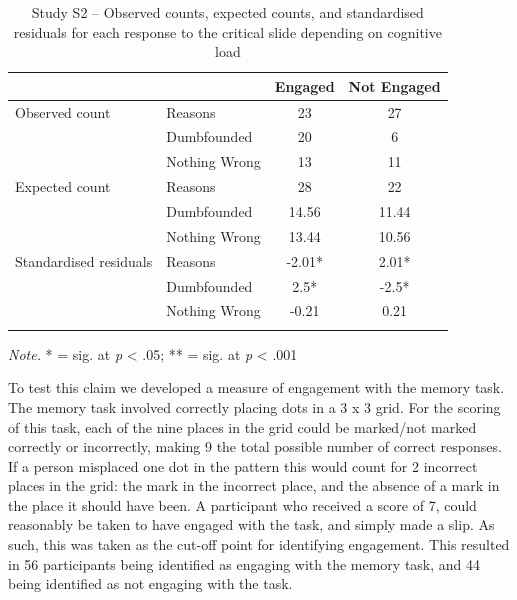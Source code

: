 \documentclass[
  american,
  man,floatsintext]{apa7}
\begin{document}
\begin{table}[tbp]

\begin{center}
\begin{threeparttable}

\caption{\label{tab:S2S2tab1dumb}Study S2 – Observed counts, expected counts, and standardised residuals for each response to the critical slide depending on cognitive load}

\begin{tabular}{llcc}
\toprule
 & \multicolumn{1}{c}{} & \multicolumn{1}{c}{Engaged} & \multicolumn{1}{c}{Not Engaged}\\
\midrule
Observed count & Reasons & 23 & 27\\
 & Dumbfounded & 20 & 6\\
 & Nothing Wrong & 13 & 11\\
Expected count & Reasons & 28 & 22\\
 & Dumbfounded & 14.56 & 11.44\\
 & Nothing Wrong & 13.44 & 10.56\\
Standardised residuals & Reasons & -2.01* & 2.01*\\
 & Dumbfounded & 2.5* & -2.5*\\
 & Nothing Wrong & -0.21 & 0.21\\
\bottomrule
\addlinespace
\end{tabular}

\begin{tablenotes}[para]
\normalsize{\textit{Note.} * = sig. at \emph{p} < .05; ** = sig. at \emph{p} < .001}
\end{tablenotes}

\end{threeparttable}
\end{center}

\end{table}

To test this claim we developed a measure of engagement with the memory task. The memory task involved correctly placing dots in a 3 x 3 grid. For the scoring of this task, each of the nine places in the grid could be marked/not marked correctly or incorrectly, making 9 the total possible number of correct responses. If a person misplaced one dot in the pattern this would count for 2 incorrect places in the grid: the mark in the incorrect place, and the absence of a mark in the place it should have been. A participant who received a score of 7, could reasonably be taken to have engaged with the task, and simply made a slip. As such, this was taken as the cut-off point for identifying engagement. This resulted in 56 participants being identified as engaging with the memory task, and 44 being identified as not engaging with the task.
\end{document}
